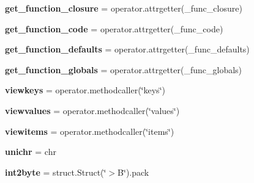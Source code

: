 \begin{DoxyCompactItemize}
{\bfseries get\+\_\+function\+\_\+closure} = operator.\+attrgetter(\+\_\+func\+\_\+closure)
\item 
\mbox{\label{namespacepkg__resources_1_1__vendor_1_1six_abb41f40004a2a039817c87dd2f69abbd}} 
{\bfseries get\+\_\+function\+\_\+code} = operator.\+attrgetter(\+\_\+func\+\_\+code)
\item 
\mbox{\label{namespacepkg__resources_1_1__vendor_1_1six_ad9dde2534bb53099f89a69a1bbb8fbe0}} 
{\bfseries get\+\_\+function\+\_\+defaults} = operator.\+attrgetter(\+\_\+func\+\_\+defaults)
\item 
\mbox{\label{namespacepkg__resources_1_1__vendor_1_1six_aeb14d76ee2046cae1dd393d1782f861f}} 
{\bfseries get\+\_\+function\+\_\+globals} = operator.\+attrgetter(\+\_\+func\+\_\+globals)
\item 
\mbox{\label{namespacepkg__resources_1_1__vendor_1_1six_a714f7630e7b1c62dfecbefd229124b6a}} 
{\bfseries viewkeys} = operator.\+methodcaller(\char`\"{}keys\char`\"{})
\item 
\mbox{\label{namespacepkg__resources_1_1__vendor_1_1six_a4337587799774a5974945b65e64222bf}} 
{\bfseries viewvalues} = operator.\+methodcaller(\char`\"{}values\char`\"{})
\item 
\mbox{\label{namespacepkg__resources_1_1__vendor_1_1six_a696f072ec877b3dcdad10c6d6b1a67d8}} 
{\bfseries viewitems} = operator.\+methodcaller(\char`\"{}items\char`\"{})
\item 
\mbox{\label{namespacepkg__resources_1_1__vendor_1_1six_a8e12d4285f05582f927cc29175b9b25a}} 
{\bfseries unichr} = chr
\item 
\mbox{\label{namespacepkg__resources_1_1__vendor_1_1six_a982f1724298879fa3c2d9c65240568f0}} 
{\bfseries int2byte} = struct.\+Struct(\char`\"{}$>$B\char`\"{}).pack
\item 
\mbox{\label{namespacepkg__resources_1_1__vendor_1_1six_a833746caeaf4274b2616eee1d9929313}} 

\end{DoxyCompactItemize}
